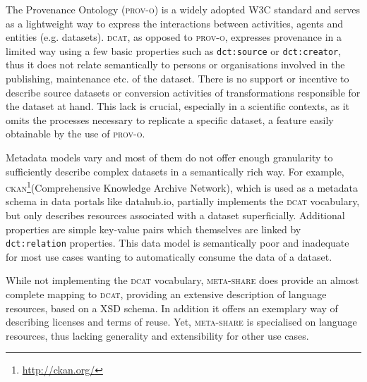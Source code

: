 \documentclass[runningheads,a4paper]{llncs}
\newcommand{\odrl}{{\scshape odrl}\xspace}
\newcommand{\prov}{{\scshape prov-o}\xspace}
\newcommand{\dct}{{\scshape dcterms}\xspace}
\newcommand{\ckan}{{\scshape ckan}\xspace}
\newcommand{\dcat}{{\scshape dcat}\xspace}
\newcommand{\metashare}{{\scshape meta-share}\xspace}
\newcommand{\prop}[1]{{{\texttt{#1}}}}
\newcommand\footnoteurl[1]{\footnote{\scriptsize\url{#1}}}
\begin{document}
 The Provenance Ontology\cite{prov} (\prov) is a widely adopted W3C standard and serves as a lightweight way to express the interactions between activities, agents and entities (e.g. datasets).
\dcat, as opposed to \prov, expresses provenance in a limited way using a few basic properties such as
\prop{dct:source} or \prop{dct:creator}, thus it does not relate semantically to persons or organisations involved in the publishing, maintenance etc. of the dataset. %
There is no support or incentive to describe source datasets or conversion activities of transformations responsible for the dataset at hand. This lack is crucial, especially in a scientific contexts, as it omits the processes necessary to replicate a specific dataset, a feature easily obtainable by the use of \prov.
\iffalse
The Open Digital Rights Language (\odrl)\footnoteurl{https://www.w3.org/ns/odrl/2/ODRL21} is an initiative of the W3C community group\footnoteurl{https://www.w3.org/community/odrl/}, aiming to develop an open standard for policy expressions. The \odrl version 2.0 core model defines
licensing policies in regard to their permissions
granted, duties and constraints associated with these
permissions as well as involved legal parties. Thus, an \odrl
description allows to specify, in a machine-readable way, if
data can be edited, integrated or redistributed.
\fi{}

Metadata models vary and most of them do not offer enough granularity to sufficiently describe complex datasets in a semantically rich way.
For example, \ckan{}\footnoteurl{http://ckan.org/}(Comprehensive Knowledge Archive Network), which is used as a metadata schema in data portals like datahub.io, partially implements the \dcat vocabulary, but only describes resources associated with a dataset superficially.
Additional properties are simple key-value pairs which themselves are linked by \prop{dct:relation} properties. This data model is semantically poor and inadequate for most use cases wanting to automatically consume the data of a dataset.

While not implementing the \dcat vocabulary, \metashare \cite{mccrae_2015_OWLmetashare} does provide an almost complete mapping to \dcat, providing an extensive description of language resources, based on a XSD schema.
In addition it offers an exemplary way of describing licenses and terms of reuse. Yet, \metashare is specialised on language resources, thus lacking generality and extensibility for other use cases.
\end{document}
